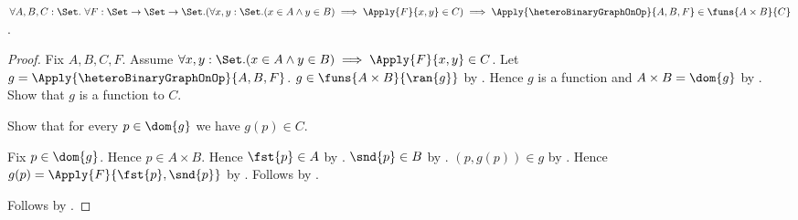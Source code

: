 \begin{theorem}\label{logical_heterogeneous_binary_graph_on_type}
    $\forall A,B,C:\Set.\ \forall F:\Set\to\Set\to\Set.
        (\forall x,y:\Set.
            (x\in A\land y\in B)\implies
            \Apply{F}{x,y}\in C)
        \implies
        \Apply{\heteroBinaryGraphOnOp}{A,B,F}
            \in\funs{A\times B}{C}$.
\end{theorem}
\begin{proof}
    Fix $A,B,C,F$.
    Assume $\forall x,y:\Set.
        (x\in A\land y\in B)\implies
        \Apply{F}{x,y}\in C$.
    Let $g=\Apply{\heteroBinaryGraphOnOp}{A,B,F}$.
    $g\in\funs{A\times B}{\ran{g}}$ by
        .
    Hence $g$ is a function and $A\times B=\dom{g}$ by
        .
    Show that $g$ is a function to $C$.
    \begin{subproof}
        Show that for every $p\in\dom{g}$ we have $g(p)\in C$.
        \begin{subproof}
            Fix $p\in\dom{g}$.
            Hence $p\in A\times B$.
            Hence $\fst{p}\in A$ by .
            $\snd{p}\in B$ by .
            $(p,g(p))\in g$ by .
            Hence
                $g(p)=\Apply{F}{\fst{p},\snd{p}}$ by
                .
            Follows by \auto.
        \end{subproof}
    \end{subproof}
    Follows by .
\end{proof}

